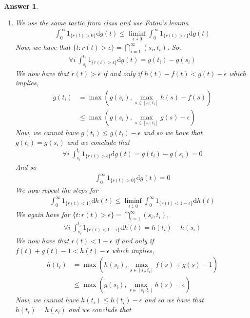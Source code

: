 \documentclass[12pt]{article}
\theoremstyle{colon}
\newtheorem*{answer}{Answer}
\begin{document}
\begin{answer}
\begin{enumerate}[label=\roman*)]
    \item We use the same tactic from class and use Fatou's lemma
      \begin{gather*}
        \int_0^\infty 1_{\{r(t)>0\}} \text{d}g(t) \leq \liminf_{\epsilon \downarrow 0} \int_0^\infty 1_{\{r(t)>\epsilon\}} \text{d}g(t)
      \end{gather*}
      Now, we have that $\{t : r(t) > \epsilon \} = \bigcap_{i=1}^\infty (s_i, t_i)$. So,
      \begin{gather*}
        \forall i \ \int_{s_i}^{t_i} 1_{\{r(t)>\epsilon\}} \text{d}g(t) = g(t_i) - g(s_i)
      \end{gather*}
      We now have that $r(t) > \epsilon$ if and only if $h(t) - f(t) < g(t) - \epsilon$ which implies,
      \begin{align*}
        g(t_i) &= \max(g(s_i), \max_{s \in [s_i, t_i]} h(s) - f(s)) \\
        &\leq \max(g(s_i), \max_{s \in [s_i, t_i]} g(s) - \epsilon)
      \end{align*}
      Now, we cannot have $g(t_i) \leq g(t_i) - \epsilon$ and so we have that $g(t_i) = g(s_i)$ and we conclude that
      \begin{gather*}
        \forall i \ \int_{s_i}^{t_i} 1_{\{r(t)>\epsilon\}} \text{d}g(t) = g(t_i) - g(s_i) = 0
      \end{gather*}
      And so
      \begin{gather*}
        \int_0^\infty 1_{\{r(t)>0\}} \text{d}g(t) = 0
      \end{gather*}
      We now repeat the steps for
      \begin{gather*}
        \int_0^\infty 1_{\{r(t)<1\}} \text{d}h(t) \leq \liminf_{\epsilon \downarrow 0} \int_0^\infty 1_{\{r(t)<1-\epsilon\}} \text{d}h(t)
      \end{gather*}
      We again have for $\{t : r(t) > \epsilon \} = \bigcap_{i=1}^\infty (s_i, t_i)$,
      \begin{gather*}
        \forall i \ \int_{s_i}^{t_i} 1_{\{r(t)<1-\epsilon\}} \text{d}h(t) = h(t_i) - h(s_i)
      \end{gather*}
      We now have that $r(t) < 1 - \epsilon$ if and only if $f(t) + g(t) - 1 < h(t) - \epsilon$ which implies,
      \begin{align*}
        h(t_i) &= \max(h(s_i), \max_{s \in [s_i, t_i]} f(s) + g(s) - 1) \\
        &\leq \max(g(s_i), \max_{s \in [s_i, t_i]} h(s) - \epsilon)
      \end{align*}
      Now, we cannot have $h(t_i) \leq h(t_i) - \epsilon$ and so we have that $h(t_i) = h(s_i)$ and we conclude that

\end{enumerate}
\end{answer}
\end{document}
